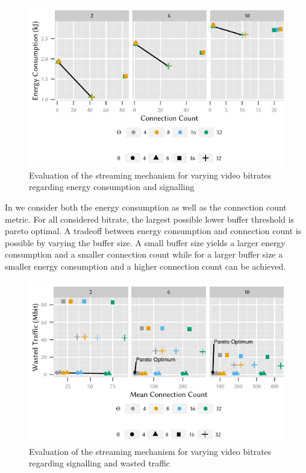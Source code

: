\begin{figure}
  \centering
  \includegraphics{application/lte_video/trade_offs/figures/energy2connections}
  \caption{Evaluation of the streaming mechanism for varying video bitrates regarding energy consumption and signalling}
  \label{fig:application:lte_video:numerical_evaluation:trade_offs:energy2connections}
\end{figure}

In  we consider both the energy consumption as well as the connection count metric.
For all considered bitrate, the largest possible lower buffer threshold is pareto optimal.
A tradeoff between energy consumption and connection count is possible by varying the buffer size.
A small buffer size yields a larger energy consumption and a smaller connection count while for a larger buffer size a smaller energy consumption and a higher connection count can be achieved.

\begin{figure}
  \centering
  \includegraphics{application/lte_video/trade_offs/figures/connections2lostData}
  \caption{Evaluation of the streaming mechanism for varying video bitrates regarding signalling and wasted traffic}
  \label{fig:application:lte_video:numerical_evaluation:trade_offs:connections2lostData}
\end{figure}

